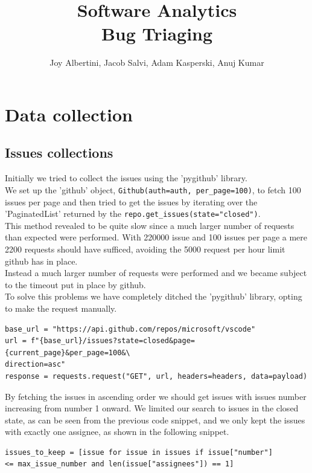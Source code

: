\documentclass[tikz,10pt,fleqn]{article}
\title{\textbf{Software Analytics\\Bug Triaging}}
\author{Joy Albertini, Jacob Salvi, Adam Kasperski, Anuj Kumar}
\date{}
\begin{document}
\maketitle

\section*{Data collection}
\subsection*{Issues collections}
Initially we tried to collect the issues using the 'pygithub' library.\\
We set up the 'github' object, \texttt{Github(auth=auth, per_page=100)}, to fetch 100 issues per page and then tried to get the issues by iterating over the 'PaginatedList' returned by the \texttt{repo.get_issues(state="closed")}.\\
This method revealed to be quite slow since a much larger number of requests than expected were performed. With 220000 issue and 100 issues per page a mere 2200 requests should have sufficed, avoiding the 5000 request per hour limit github has in place.\\
Instead a much larger number of requests were performed and we became subject to the timeout put in place by github. \\
To solve this problems we have completely ditched the 'pygithub' library, opting to make the request manually.

\begin{verbatim}
base_url = "https://api.github.com/repos/microsoft/vscode"
url = f"{base_url}/issues?state=closed&page={current_page}&per_page=100&\
direction=asc"
response = requests.request("GET", url, headers=headers, data=payload)
\end{verbatim}

By fetching the issues in ascending order we should get issues with issues number increasing from number 1 onward. We limited our search to issues in the closed state, as can be seen from the previous code snippet, and we only kept the issues with exactly one assignee, as shown in the following snippet.\\
\begin{verbatim}
issues_to_keep = [issue for issue in issues if issue["number"] 
<= max_issue_number and len(issue["assignees"]) == 1]
\end{verbatim}
\end{document}
